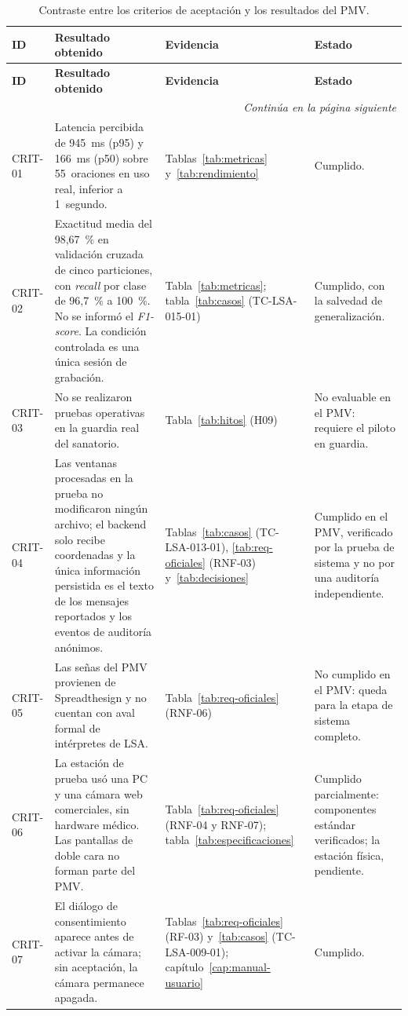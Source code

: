 {\footnotesize
\setlength{\tabcolsep}{3pt}
\begin{longtable}{@{}p{1.4cm}p{6.0cm}p{3.6cm}p{4.0cm}@{}}
\caption{Contraste entre los criterios de aceptación y los resultados del PMV.}\label{tab:crit-res}\\
\toprule
\textbf{ID} & \textbf{Resultado obtenido} & \textbf{Evidencia} & \textbf{Estado} \\
\midrule
\endfirsthead
\toprule
\textbf{ID} & \textbf{Resultado obtenido} & \textbf{Evidencia} & \textbf{Estado} \\
\midrule
\endhead
\midrule
\multicolumn{4}{r}{\emph{Continúa en la página siguiente}}\\
\endfoot
\bottomrule
\endlastfoot
CRIT-01 & Latencia percibida de 945~ms (p95) y 166~ms (p50) sobre 55~oraciones en uso real, inferior a 1~segundo. & Tablas~\ref{tab:metricas} y~\ref{tab:rendimiento} & Cumplido. \\
CRIT-02 & Exactitud media del 98,67~\% en validación cruzada de cinco particiones, con \emph{recall} por clase de 96,7~\% a 100~\%. No se informó el \emph{F1-score}. La condición controlada es una única sesión de grabación. & Tabla~\ref{tab:metricas}; tabla~\ref{tab:casos} (TC-LSA-015-01) & Cumplido, con la salvedad de generalización. \\
CRIT-03 & No se realizaron pruebas operativas en la guardia real del sanatorio. & Tabla~\ref{tab:hitos} (H09) & No evaluable en el PMV: requiere el piloto en guardia. \\
CRIT-04 & Las ventanas procesadas en la prueba no modificaron ningún archivo; el backend solo recibe coordenadas y la única información persistida es el texto de los mensajes reportados y los eventos de auditoría anónimos. & Tablas~\ref{tab:casos} (TC-LSA-013-01), \ref{tab:req-oficiales} (RNF-03) y~\ref{tab:decisiones} & Cumplido en el PMV, verificado por la prueba de sistema y no por una auditoría independiente. \\
CRIT-05 & Las señas del PMV provienen de Spreadthesign y no cuentan con aval formal de intérpretes de LSA. & Tabla~\ref{tab:req-oficiales} (RNF-06) & No cumplido en el PMV: queda para la etapa de sistema completo. \\
CRIT-06 & La estación de prueba usó una PC y una cámara web comerciales, sin hardware médico. Las pantallas de doble cara no forman parte del PMV. & Tabla~\ref{tab:req-oficiales} (RNF-04 y RNF-07); tabla~\ref{tab:especificaciones} & Cumplido parcialmente: componentes estándar verificados; la estación física, pendiente. \\
CRIT-07 & El diálogo de consentimiento aparece antes de activar la cámara; sin aceptación, la cámara permanece apagada. & Tablas~\ref{tab:req-oficiales} (RF-03) y~\ref{tab:casos} (TC-LSA-009-01); capítulo~\ref{cap:manual-usuario} & Cumplido. \\
\end{longtable}
}


